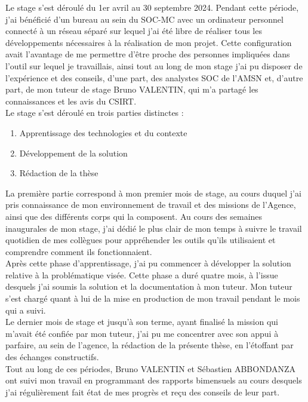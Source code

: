 \vspace{1em}

Le stage s'est déroulé du 1er avril au 30 septembre 2024. Pendant cette période, j'ai bénéficié d'un bureau au sein du SOC-MC avec un ordinateur personnel connecté à un réseau séparé sur lequel j'ai été libre de réaliser tous les développements nécessaires à la réalisation de mon projet. Cette configuration avait l'avantage de me permettre d'être proche des personnes impliquées dans l'outil sur lequel je travaillais, ainsi tout au long de mon stage j'ai pu disposer de l'expérience et des conseils, d'une part, des analystes SOC de l'AMSN et, d'autre part, de mon tuteur de stage Bruno VALENTIN, qui m'a partagé les connaissances et les avis du CSIRT.\\

Le stage s’est déroulé en trois parties distinctes :
\vspace{0.5em}
\begin{enumerate}[itemsep=0.5em]
    \item Apprentissage des technologies et du contexte
    \item Développement de la solution
    \item Rédaction de la thèse\\
\end{enumerate}

La première partie correspond à mon premier mois de stage, au cours duquel j'ai pris connaissance de mon environnement de travail et des missions de l'Agence, ainsi que des différents corps qui la composent. Au cours des semaines inaugurales de mon stage, j'ai dédié le plus clair de mon temps à suivre le travail quotidien de mes collègues pour appréhender les outils qu'ils utilisaient et comprendre comment ils fonctionnaient.\\

Après cette phase d'apprentissage, j'ai pu commencer à développer la solution relative à 
la problématique visée. Cette phase a duré quatre mois, à l'issue desquels j'ai soumis la solution et la documentation à mon tuteur. Mon tuteur s'est chargé quant à lui de la mise en production de mon travail pendant le mois qui a suivi.\\

Le dernier mois de stage et jusqu'à son terme, ayant finalisé la mission qui m'avait été confiée par mon tuteur, j'ai pu me concentrer avec son appui à parfaire, au sein de l'agence, la rédaction de la présente thèse, en l'étoffant par des échanges constructifs.\\

Tout au long de ces périodes, Bruno VALENTIN et Sébastien ABBONDANZA ont suivi mon travail en programmant des rapports bimensuels au cours desquels j'ai régulièrement fait état de mes progrès et reçu des conseils de leur part.